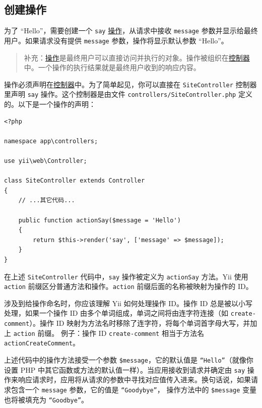 \subsection{创建操作 \label{start-hello.md::creating-action}}
为了 “Hello”，需要创建一个 \lstinline|say| \hyperref[structure-controllers.md::creating-actions]{操作}，从请求中接收 \lstinline|message| 参数并显示给最终用户。如果请求没有提供 \lstinline|message| 参数，操作将显示默认参数 “Hello”。

\begin{quote}补充：\hyperref[structure-controllers.md::creating-actions]{操作}是最终用户可以直接访问并执行的对象。操作被组织在\hyperref[structure-controllers.md]{控制器}中。一个操作的执行结果就是最终用户收到的响应内容。

\end{quote}
操作必须声明在\hyperref[structure-controllers.md]{控制器}中。为了简单起见，你可以直接在 \lstinline|SiteController| 控制器里声明 \lstinline|say| 操作。这个控制器是由文件 \lstinline|controllers/SiteController.php| 定义的。以下是一个操作的声明：

\lstset{language=php}\begin{lstlisting}
<?php

namespace app\controllers;

use yii\web\Controller;

class SiteController extends Controller
{
    // ...其它代码...

    public function actionSay($message = 'Hello')
    {
        return $this->render('say', ['message' => $message]);
    }
}
\end{lstlisting}
在上述 \lstinline|SiteController| 代码中，\lstinline|say| 操作被定义为 \lstinline|actionSay| 方法。Yii 使用 \lstinline|action| 前缀区分普通方法和操作。\lstinline|action| 前缀后面的名称被映射为操作的 ID。

涉及到给操作命名时，你应该理解 Yii 如何处理操作 ID。操作 ID 总是被以小写处理，如果一个操作 ID 由多个单词组成，单词之间将由连字符连接（如 \lstinline|create-comment|）。操作 ID 映射为方法名时移除了连字符，将每个单词首字母大写，并加上 \lstinline|action| 前缀。 例子：操作 ID \lstinline|create-comment| 相当于方法名 \lstinline|actionCreateComment|。

上述代码中的操作方法接受一个参数 \lstinline|$message|，它的默认值是 \lstinline|“Hello”|（就像你设置 PHP 中其它函数或方法的默认值一样）。当应用接收到请求并确定由 \lstinline|say| 操作来响应请求时，应用将从请求的参数中寻找对应值传入进来。换句话说，如果请求包含一个 \lstinline|message| 参数，它的值是 \lstinline|“Goodybye”|， 操作方法中的 \lstinline|$message| 变量也将被填充为 \lstinline|“Goodbye”|。

